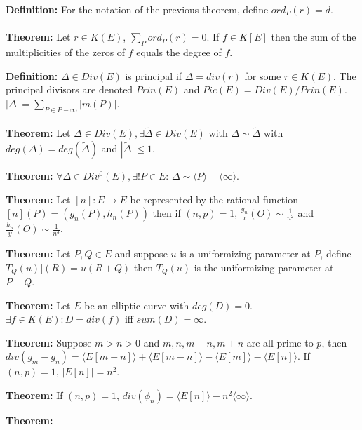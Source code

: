 {\bf Definition:}
For the notation of the previous theorem, define $ord_P(r)= d$.
\\
\\
{\bf Theorem:} 
Let $r \in K(E)$, $\sum_P ord_P(r) = 0$.  If $f \in K[E]$ then the sum of the
multiplicities of the zeros of $f$ equals the degree of $f$.
\begin{quote}
\end{quote}
{\bf Definition:}
$\Delta \in Div(E)$ is principal if $\Delta= div(r)$ for some $r \in K(E)$.  The
principal divisors are denoted $Prin(E)$ and $Pic(E)= Div(E)/Prin(E)$.  
$|\Delta|= \sum_{P \in P- \infty} |m(P)|$.
\\
\\
{\bf Theorem:} 
Let $\Delta \in Div(E), \exists \tilde{\Delta} \in Div(E)$ with
$\Delta \sim \tilde{\Delta}$ with
$deg(\Delta)=deg(\tilde{\Delta})$ and
$|\tilde{\Delta}| \le 1$.  \begin{quote}
\end{quote}
{\bf Theorem:} 
$\forall \Delta \in Div^0(E), \exists ! P \in E$: 
$\Delta \sim \langle P \rangle -\langle \infty \rangle$.
\begin{quote}
\end{quote}
{\bf Theorem:} 
Let $[n]: E \rightarrow E$ be represented by the rational function 
$[n](P)=(g_n(P), h_n(P))$ then if $(n,p)=1$, 
${\frac {g_n} x} (O) \sim {\frac 1 {n^2}}$ and
${\frac {h_n} y} (O) \sim {\frac 1 {n^3}}$.
\begin{quote}
\end{quote}
{\bf Theorem:} 
Let $P, Q \in E$ and suppose $u$ is a uniformizing parameter at $P$,
define $T_Q(u)](R)=u(R+Q)$ then $T_Q(u)$ is the uniformizing
parameter at $P-Q$.
\begin{quote}
\end{quote}
{\bf Theorem:} 
Let $E$ be an elliptic curve with $deg(D)=0$.  $\exists f \in K(E): D= div(f)$ iff
$sum(D)= \infty$.
\begin{quote}
\end{quote}
{\bf Theorem:} 
Suppose $m>n>0$ and $m, n, m-n, m+n$ are all prime to $p$, then
$div(g_m-g_n)= 
\langle E[m+n] \rangle+
\langle E[m-n] \rangle-
\langle E[m] \rangle-
\langle E[n] \rangle$.  
If $(n,p)=1$, $|E[n]|= n^2$.
\begin{quote}
\end{quote}
{\bf Theorem:} 
If $(n,p)=1$, $div(\phi_n)= \langle E[n] \rangle - n^2 \langle \infty \rangle$.
\begin{quote}
\end{quote}
{\bf Theorem:} 
